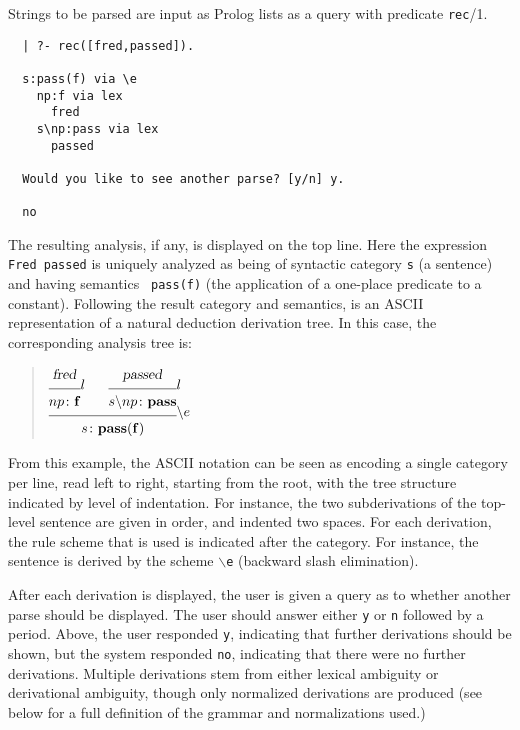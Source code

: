 
Strings to be parsed are input as Prolog lists as a query with predicate
{\tt rec}/1. 
%
\begin{verbatim}
  | ?- rec([fred,passed]).

  s:pass(f) via \e
    np:f via lex
      fred
    s\np:pass via lex
      passed

  Would you like to see another parse? [y/n] y.

  no
\end{verbatim}
%
The resulting analysis, if any, is displayed on the top line.  
Here the expression {\tt Fred passed} is uniquely analyzed as being of
syntactic category {\tt s} (a sentence) and having semantics {\tt
pass(f)} (the application of a one-place predicate to a constant).
Following the result category and semantics, is an ASCII
representation of a natural deduction derivation tree.  In this case,
the corresponding analysis tree is:
%
\begin{quote}
\small
$
\infr{\infr{\men{fred}}
           {\synsem{np}
                   {\con{f}}}
           {\lexr}
      \qquad
      \infr{\men{passed}}
           {\synsem{\bk{s}
                       {np}}
                   {\con{pass}}}
           {\lexr}}
     {\synsem{s}
             {\con{pass}
              (\con{f})}}
     {\bel}
$
\end{quote}
%
From this example, the ASCII notation can be seen as encoding a single
category per line, read left to right, starting from the root, with
the tree structure indicated by level of indentation.  For instance,
the two subderivations of the top-level sentence are given in order,
and indented two spaces.  For each derivation, the rule scheme that is used
is indicated after the category.  For instance, the sentence is
derived by the scheme {\tt $\backslash$e} (backward slash
elimination).  

After each derivation is displayed, the user is given a query as to
whether another parse should be displayed.  The user should answer
either {\tt y} or {\tt n} followed by a period.  Above, the user
responded {\tt y}, indicating that further derivations should be
shown, but the system responded {\tt no}, indicating that there were
no further derivations.  Multiple derivations stem from either
lexical ambiguity or derivational ambiguity, though only normalized
derivations are produced (see below for a full definition of the
grammar and normalizations used.)



